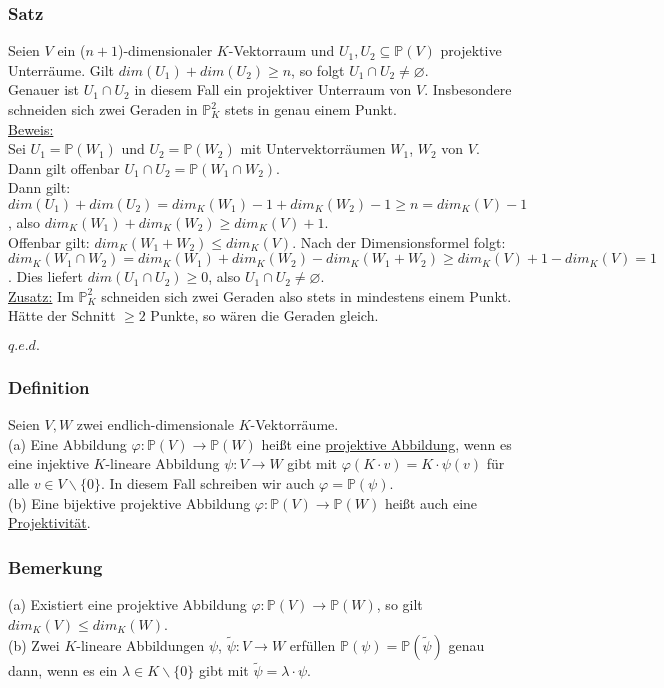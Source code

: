 \documentclass[a4paper]{article}
\newcommand{\ul}{\underline}
\renewcommand{\proof}{\ul{Beweis:}\\}
\renewcommand{\qed}{\begin{flushright}
\ul{\(q.e.d.\)}
\end{flushright}}
\let\phi\varphi
\begin{document}
\subsubsection{Satz}
Seien \(V\) ein (\(n+1\))-dimensionaler \(K\)-Vektorraum und \(U_1,U_2\subseteq\mathbb{P}(V)\) projektive Unterräume. Gilt \(dim(U_1)+dim(U_2)\geq n\), so folgt \(U_1\cap U_2\ne\varnothing\).\\
Genauer ist \(U_1\cap U_2\) in diesem Fall ein projektiver Unterraum von \(V\). Insbesondere schneiden sich zwei Geraden in \(\mathbb{P}_K^2\) stets in genau einem Punkt.\\
\proof
Sei \(U_1=\mathbb{P}(W_1)\) und \(U_2=\mathbb{P}(W_2)\) mit Untervektorräumen \(W_1\), \(W_2\) von \(V\). Dann gilt offenbar \(U_1\cap U_2=\mathbb{P}(W_1\cap W_2)\).\\
Dann gilt: \(dim(U_1)+dim(U_2)=dim_K(W_1)-1+dim_K(W_2)-1\geq n=dim_K(V)-1\), also \(dim_K(W_1)+dim_K(W_2)\geq dim_K(V)+1\).\\
Offenbar gilt: \(dim_K(W_1+W_2)\leq dim_K(V)\). Nach der Dimensionsformel folgt:\\
\(dim_K(W_1\cap W_2)=dim_K(W_1)+dim_K(W_2)-dim_K(W_1+W_2)\geq dim_K(V)+1-dim_K(V)=1\). Dies liefert \(dim(U_1\cap U_2)\geq 0\), also \(U_1\cap U_2\neq \varnothing\).\\
\ul{Zusatz:} Im \(\mathbb{P}_K^2\) schneiden sich zwei Geraden also stets in mindestens einem Punkt. Hätte der Schnitt \(\geq 2\) Punkte, so wären die Geraden gleich.
\qed
\subsubsection{Definition}
Seien \(V,W\) zwei endlich-dimensionale \(K\)-Vektorräume.\\
(a) Eine Abbildung \(\phi:\mathbb{P}(V)\rightarrow\mathbb{P}(W)\) heißt eine \ul{projektive Abbildung}, wenn es eine injektive \(K\)-lineare Abbildung \(\psi:V\rightarrow W\) gibt mit \(\phi(K\cdot v)=K\cdot\psi(v)\) für alle \(v\in V\backslash\{0\}\). In diesem Fall schreiben wir auch \(\phi=\mathbb{P}(\psi)\).\\
(b) Eine bijektive projektive Abbildung \(\phi:\mathbb{P}(V)\rightarrow\mathbb{P}(W)\) heißt auch eine \ul{Projektivität}.
\subsubsection{Bemerkung}
(a) Existiert eine projektive Abbildung \(\phi:\mathbb{P}(V)\rightarrow\mathbb{P}(W)\), so gilt \(dim_K(V)\leq dim_K(W)\).\\
(b) Zwei \(K\)-lineare Abbildungen \(\psi\), \(\tilde{\psi}:V\rightarrow W\) erfüllen \(\mathbb{P}(\psi)=\mathbb{P}(\tilde{\psi})\) genau dann, wenn es ein \(\lambda\in K\backslash\{0\}\) gibt mit \(\tilde{\psi}=\lambda\cdot\psi\).
\end{document}
